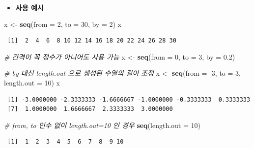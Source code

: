 \documentclass[
  11pt,
]{krantz}
\newenvironment{Shaded}{\begin{snugshade}}{\end{snugshade}}
\newcommand{\CommentTok}[1]{\textcolor[rgb]{0.37,0.37,0.37}{\textit{#1}}}
\newcommand{\DataTypeTok}[1]{\textcolor[rgb]{0.27,0.27,0.27}{#1}}
\newcommand{\DecValTok}[1]{\textcolor[rgb]{0.06,0.06,0.06}{#1}}
\newcommand{\FloatTok}[1]{\textcolor[rgb]{0.06,0.06,0.06}{#1}}
\newcommand{\KeywordTok}[1]{\textcolor[rgb]{0.27,0.27,0.27}{\textbf{#1}}}
\newcommand{\NormalTok}[1]{#1}
\newcommand{\StringTok}[1]{\textcolor[rgb]{0.5,0.5,0.5}{#1}}
\providecommand{\tightlist}{%
  \setlength{\itemsep}{0pt}\setlength{\parskip}{0pt}}
\begin{document}
\begin{itemize}
\tightlist
\item
  \textbf{사용 예시}
\end{itemize}

\footnotesize

\begin{Shaded}
\begin{Highlighting}[]
\NormalTok{x <-}\StringTok{ }\KeywordTok{seq}\NormalTok{(}\DataTypeTok{from =} \DecValTok{2}\NormalTok{, }\DataTypeTok{to =} \DecValTok{30}\NormalTok{, }\DataTypeTok{by =} \DecValTok{2}\NormalTok{)}
\NormalTok{x }
\end{Highlighting}
\end{Shaded}

\begin{verbatim}
 [1]  2  4  6  8 10 12 14 16 18 20 22 24 26 28 30
\end{verbatim}

\begin{Shaded}
\begin{Highlighting}[]
\CommentTok{# 간격이 꼭 정수가 아니어도 사용 가능}
\NormalTok{x <-}\StringTok{ }\KeywordTok{seq}\NormalTok{(}\DataTypeTok{from =} \DecValTok{0}\NormalTok{, }\DataTypeTok{to =} \DecValTok{3}\NormalTok{, }\DataTypeTok{by =} \FloatTok{0.2}\NormalTok{)}

\CommentTok{# by 대신 length.out 으로 생성된 수열의 길이 조정}
\NormalTok{x <-}\StringTok{ }\KeywordTok{seq}\NormalTok{(}\DataTypeTok{from =} \DecValTok{-3}\NormalTok{, }\DataTypeTok{to =} \DecValTok{3}\NormalTok{, }\DataTypeTok{length.out =} \DecValTok{10}\NormalTok{)}
\NormalTok{x}
\end{Highlighting}
\end{Shaded}

\begin{verbatim}
 [1] -3.0000000 -2.3333333 -1.6666667 -1.0000000 -0.3333333  0.3333333
 [7]  1.0000000  1.6666667  2.3333333  3.0000000
\end{verbatim}

\begin{Shaded}
\begin{Highlighting}[]
\CommentTok{# from, to 인수 없이 length.out=10 인 경우}
\KeywordTok{seq}\NormalTok{(}\DataTypeTok{length.out =} \DecValTok{10}\NormalTok{)}
\end{Highlighting}
\end{Shaded}

\begin{verbatim}
 [1]  1  2  3  4  5  6  7  8  9 10
\end{verbatim}
\end{document}
